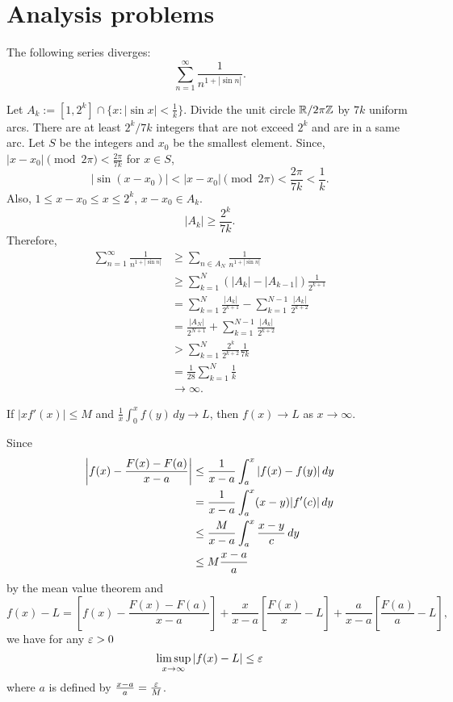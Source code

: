 \documentclass[11pt]{article}
\let\realsection\section
\renewcommand\section{\newpage\realsection}
\begin{document}
\section{Analysis problems}

\begin{prb}
The following series diverges: \[\sum_{n=1}^\infty\frac1{n^{1+|\sin n|}}.\]
\end{prb}
\begin{sol}
Let $A_k:=[1,2^k]\cap\{x:|\sin x|<\frac1k\}$.
Divide the unit circle $\mathbb{R}/2\pi\mathbb{Z}$ by $7k$ uniform arcs.
There are at least $2^k/7k$ integers that are not exceed $2^k$ and are in a same arc.
Let $S$ be the integers and $x_0$ be the smallest element.
Since, $|x-x_0|\pmod{2\pi}<\frac{2\pi}{7k}$ for $x\in S$,
\[|\sin(x-x_0)|<|x-x_0|\pmod{2\pi}<\frac{2\pi}{7k}<\frac1k.\]
Also, $1\le x-x_0\le x\le2^k$, $x-x_0\in A_k$.
\[|A_k|\ge\frac{2^k}{7k}.\]
Therefore,
\begin{align*}
\sum_{n=1}^\infty\frac1{n^{1+|\sin n|}}
&\ge\sum_{n\in A_N}\frac1{n^{1+|\sin n|}}\\
&\ge\sum_{k=1}^N(|A_k|-|A_{k-1}|)\frac1{2^{k+1}}\\
&=\sum_{k=1}^N\frac{|A_k|}{2^{k+1}}-\sum_{k=1}^{N-1}\frac{|A_k|}{2^{k+2}}\\
&=\frac{|A_N|}{2^{N+1}}+\sum_{k=1}^{N-1}\frac{|A_k|}{2^{k+2}}\\
&>\sum_{k=1}^N\frac{2^k}{2^{k+2}}\frac1{7k}\\
&=\frac1{28}\sum_{k=1}^N\frac1k\\
&\to\infty.
\end{align*}
\end{sol}

\clearpage
\begin{prb}
If $|xf'(x)|\le M$ and $\frac1x\int_0^xf(y)\,dy\to L$, then $f(x)\to L$ as $x\to\infty$.
\end{prb}
\begin{sol}
Since
\begin{align*}
\left\lvert f(x)-\frac{F(x)-F(a)}{x-a}\right\rvert
&\le\frac1{x-a}\int_a^x|f(x)-f(y)|\,dy\\
&=\frac1{x-a}\int_a^x(x-y)|f'(c)|\,dy\\
&\le\frac M{x-a}\int_a^x\frac{x-y}c\,dy\\
&\le M\frac{x-a}a
\end{align*}
by the mean value theorem and 
\[f(x)-L=\left[f(x)-\frac{F(x)-F(a)}{x-a}\right]+\frac x{x-a}\left[\frac{F(x)}x-L\right]+\frac a{x-a}\left[\frac{F(a)}a-L\right],\]
we have for any $\varepsilon>0$
\[\limsup_{x\to\infty}|f(x)-L|\le\e\]
where $a$ is defined by $\frac{x-a}a=\frac{\varepsilon} M$.
\end{sol}
\end{document}
